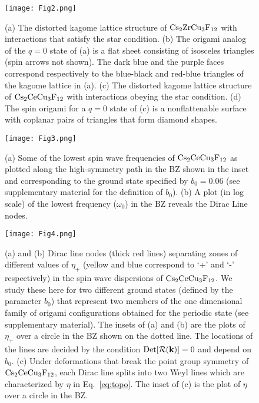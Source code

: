 \documentclass[a4paper,aps,prl,twocolumn,floatfix,showpacs,superscriptaddress]{revtex4-1}
\begin{document}
\begin{figure}
 \centering
 \texttt{[image: Fig2.png]}
 \caption{(a) The distorted kagome lattice structure of ${\rm Cs}_2{\rm ZrCu}_3{\rm F}_{12}$ with interactions that satisfy the star condition. (b) The origami analog of the $q=0$ state of (a) is a flat sheet consisting of isosceles triangles (spin arrows not shown). The dark blue and the purple faces correspond respectively to the blue-black and red-blue triangles of the kagome lattice in (a).
 (c) The distorted kagome lattice structure of ${\rm Cs}_2{\rm CeCu}_3{\rm F}_{12}$ with interactions obeying the star condition. (d) The spin origami for a $q=0$ state of (c) is a nonflattenable surface with coplanar pairs of triangles that form diamond shapes.}
\label{figg2}
\end{figure}
%
\begin{figure}
\centering
 \texttt{[image: Fig3.png]}
 \caption{(a) Some of the lowest spin wave frequencies of ${\rm Cs}_2{\rm CeCu}_3{\rm F}_{12}$ as plotted along the high-symmetry path in the BZ shown in the inset and corresponding to the ground state specified by $b_0=0.06$ (see supplementary material for the definition of $b_0$). (b) A plot (in log scale) of the lowest frequency ($\omega_0$) in the BZ reveals the Dirac Line nodes.}
 \label{figg3}
\end{figure} 

\begin{figure*}
\centering
 \texttt{[image: Fig4.png]}
 \caption{(a) and (b) Dirac line nodes (thick red lines) separating zones of different values of $\eta_+$ (yellow and blue correspond to `+' and `-' respectively) in the spin wave dispersions of ${\rm Cs}_2{\rm CeCu}_3{\rm F}_{12}$. We study these here for two different ground states (defined by the parameter $b_0$) that represent two members of the one dimensional family of origami configurations obtained for the periodic state (see supplementary material). The insets of (a) and (b) are the plots of $\eta_+$ over a circle in the BZ shown on the dotted line. The locations of the lines are decided by the condition $\text{Det}[\mathcal{R}({\bf{k}})]=0$ and depend on $b_0$. (c) Under deformations that break the point group symmetry of ${\rm Cs}_2{\rm CeCu}_3{\rm F}_{12}$, each Dirac line splits into two Weyl lines which are characterized by $\eta$ in Eq.~\ref{eq:topo}. The inset of (c) is the plot of $\eta$ over a circle in the BZ.}
 \label{figg4}
\end{figure*} 
\end{document}
